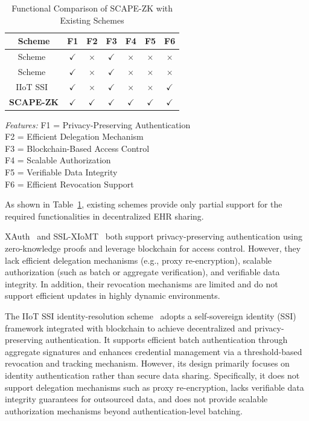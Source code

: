 \documentclass[conference]{IEEEtran}
\begin{document}
\begin{table}[htbp]
\caption{Functional Comparison of SCAPE-ZK with Existing Schemes}
\label{tab:comparison}
\centering
\begin{tabular}{|c|c|c|c|c|c|c|}
\hline
\rowcolor{lightgray!50}
\textbf{Scheme} & \textbf{F1} & \textbf{F2} & \textbf{F3} & \textbf{F4} & \textbf{F5} & \textbf{F6} \\
\hline
Scheme~\cite{b6} & $\checkmark$ & $\times$ & $\checkmark$ & $\times$ & $\times$ & $\times$ \\
\hline
Scheme~\cite{b8} & $\checkmark$ & $\times$ & $\checkmark$ & $\times$ & $\times$ & $\times$ \\
\hline
IIoT SSI~\cite{b30} & $\checkmark$ & $\times$ & $\checkmark$ & $\times$ & $\times$ & $\checkmark$ \\
\hline
\textbf{SCAPE-ZK} & $\checkmark$ & $\checkmark$ & $\checkmark$ & $\checkmark$ & $\checkmark$ & $\checkmark$ \\
\hline
\end{tabular}
\vspace{3pt}

\small{\textit{Features:}
F1 = Privacy-Preserving Authentication \\
F2 = Efficient Delegation Mechanism \\
F3 = Blockchain-Based Access Control \\
F4 = Scalable Authorization \\
F5 = Verifiable Data Integrity \\
F6 = Efficient Revocation Support}
\end{table}



As shown in Table~\ref{tab:comparison}, existing schemes provide only partial support for the required functionalities in decentralized EHR sharing.

XAuth~\cite{b6} and SSL-XIoMT~\cite{b8} both support privacy-preserving authentication using zero-knowledge proofs and leverage blockchain for access control. However, they lack efficient delegation mechanisms (e.g., proxy re-encryption), scalable authorization (such as batch or aggregate verification), and verifiable data integrity. In addition, their revocation mechanisms are limited and do not support efficient updates in highly dynamic environments.

The IIoT SSI identity-resolution scheme~\cite{b30} adopts a self-sovereign identity (SSI) framework integrated with blockchain to achieve decentralized and privacy-preserving authentication. It supports efficient batch authentication through aggregate signatures and enhances credential management via a threshold-based revocation and tracking mechanism. However, its design primarily focuses on identity authentication rather than secure data sharing. Specifically, it does not support delegation mechanisms such as proxy re-encryption, lacks verifiable data integrity guarantees for outsourced data, and does not provide scalable authorization mechanisms beyond authentication-level batching.
\end{document}
